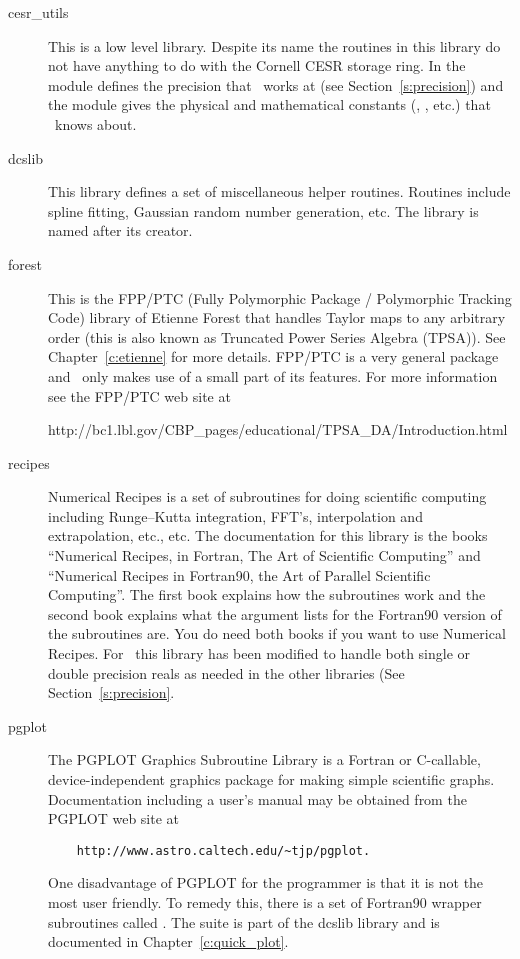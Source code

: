 \begin{description}

\item[cesr\_utils] This is a low level library. Despite its name the
routines in this library do not have anything to do with the Cornell
CESR storage ring.  In  the module 
defines the precision that \bmad\ works at (see
Section~\ref{s:precision}) and the module 
gives the physical and mathematical constants (, ,
etc.) that \bmad\ knows about.

\item[dcslib] This library defines a set of miscellaneous helper
routines.  Routines include spline fitting, Gaussian random number
generation, etc. The library is named after its creator.

\item[forest] This is the FPP/PTC (Fully Polymorphic Package /
Polymorphic Tracking Code) library of Etienne Forest that handles
Taylor maps to any arbitrary order (this is also known as Truncated
Power Series Algebra (TPSA)). See Chapter~\ref{c:etienne} for more
details.  FPP/PTC is a very general package and \bmad\ only makes use
of a small part of its features.  For more information see the FPP/PTC
web site at
\begin{example} 
   http://bc1.lbl.gov/CBP_pages/educational/TPSA_DA/Introduction.html
\end{example}

\item[recipes] Numerical Recipes is a set of subroutines for doing
scientific computing including Runge--Kutta integration, FFT's,
interpolation and extrapolation, etc., etc. The documentation for this
library is the books ``Numerical Recipes, in Fortran, The Art of
Scientific Computing''\cite{b:nr} and ``Numerical Recipes in
Fortran90, the Art of Parallel Scientific Computing''\cite{b:nr.f90}.
The first book explains how the subroutines work and the second book
explains what the argument lists for the Fortran90 version of the
subroutines are. You do need both books if you want to use Numerical
Recipes.  For \bmad\ this library has been modified to handle both
single or double precision reals as needed in the other libraries (See
Section~\ref{s:precision}.

\item[pgplot] The PGPLOT Graphics Subroutine Library is a Fortran or
C-callable, device-independent graphics package for making simple
scientific graphs. Documentation including a user's manual may be
obtained from the PGPLOT web site at
\begin{verbatim}
    http://www.astro.caltech.edu/~tjp/pgplot.
\end{verbatim} 
One disadvantage of PGPLOT for the programmer is that it is not the
most user friendly. To remedy this, there is a set of Fortran90
wrapper subroutines called .  The 
suite is part of the dcslib library and is documented in
Chapter~\ref{c:quick_plot}.

\end{description}


